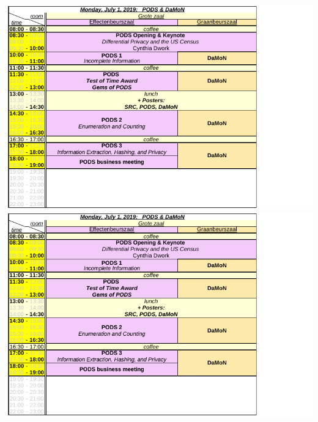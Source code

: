 \newpage

\vspace{-10mm}%

\ifodd\value{page}
\includegraphics[angle=90,width=\textwidth]{schedule/p2.pdf}%
\else
\includegraphics[angle=270,width=\textwidth]{schedule/p2.pdf}%
\fi

\newpage

